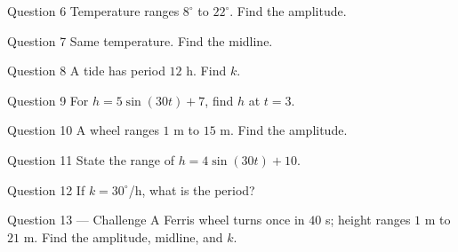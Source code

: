 \documentclass[11pt]{article}
\begin{document}
\begin{qbox}{Question 6}
Temperature ranges $8^\circ$ to $22^\circ$. Find the amplitude.\workspace{2.4cm}
\end{qbox}

\begin{qbox}{Question 7}
Same temperature. Find the midline.\workspace{2.4cm}
\end{qbox}

\begin{qbox}{Question 8}
A tide has period $12$ h. Find $k$.\workspace{2.4cm}
\end{qbox}

\begin{qbox}{Question 9}
For $h=5\sin(30t)+7$, find $h$ at $t=3$.\workspace{2.6cm}
\end{qbox}

\begin{qbox}{Question 10}
A wheel ranges $1$ m to $15$ m. Find the amplitude.\workspace{2.4cm}
\end{qbox}

\begin{qbox}{Question 11}
State the range of $h=4\sin(30t)+10$.\workspace{2.4cm}
\end{qbox}

\begin{qbox}{Question 12}
If $k=30^\circ$/h, what is the period?\workspace{2.4cm}
\end{qbox}

\begin{qbox}{Question 13 --- Challenge}
A Ferris wheel turns once in $40$ s; height ranges $1$ m to $21$ m. Find the amplitude, midline, and $k$.\workspace{4cm}
\end{qbox}

\clearpage
{}
\end{document}
